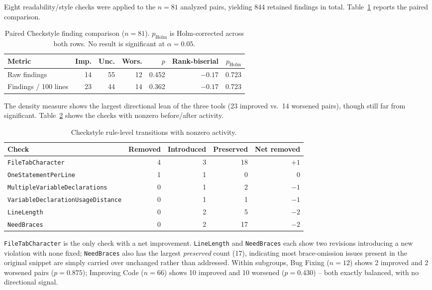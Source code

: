 Eight readability/style checks were applied to the $n=81$ analyzed
pairs, yielding 844 retained findings in total.
Table~\ref{tab:ba-checkstyle} reports the paired comparison.

\begin{table}[htbp]
\centering
\caption{Paired Checkstyle finding comparison ($n=81$). $p_{\text{Holm}}$
is Holm-corrected across both rows. No result is significant at
$\alpha=0.05$.}
\label{tab:ba-checkstyle}
\small
\begin{tabular}{lrrrrrr}
\toprule
Metric & Imp. & Unc. & Wors. & $p$ & Rank-biserial & $p_{\text{Holm}}$ \\
\midrule
Raw findings         & 14 & 55 & 12 & 0.452 & $-0.17$ & 0.723 \\
Findings / 100 lines & 23 & 44 & 14 & 0.362 & $-0.17$ & 0.723 \\
\bottomrule
\end{tabular}
\end{table}

The density measure shows the largest directional lean of the three
tools (23 improved vs.\ 14 worsened pairs), though still far from
significant. Table~\ref{tab:ba-checkstyle-rules} shows the checks with
nonzero before/after activity.

\begin{table}[htbp]
\centering
\caption{Checkstyle rule-level transitions with nonzero activity.}
\label{tab:ba-checkstyle-rules}
\small
\begin{tabular}{lrrrr}
\toprule
Check & Removed & Introduced & Preserved & Net removed \\
\midrule
\texttt{FileTabCharacter}                  & 4 & 3 & 18 & $+1$ \\
\texttt{OneStatementPerLine}                & 1 & 1 & 0  & $0$ \\
\texttt{MultipleVariableDeclarations}       & 0 & 1 & 2  & $-1$ \\
\texttt{VariableDeclarationUsageDistance}   & 0 & 1 & 1  & $-1$ \\
\texttt{LineLength}                          & 0 & 2 & 5  & $-2$ \\
\texttt{NeedBraces}                          & 0 & 2 & 17 & $-2$ \\
\bottomrule
\end{tabular}
\end{table}

\texttt{FileTabCharacter} is the only check with a net improvement.
\texttt{LineLength} and \texttt{NeedBraces} each show two revisions
introducing a new violation with none fixed; \texttt{NeedBraces} also has
the largest \emph{preserved} count (17), indicating most brace-omission
issues present in the original snippet are simply carried over unchanged
rather than addressed. Within subgroups, Bug Fixing ($n=12$) shows 2
improved and 2 worsened pairs ($p=0.875$); Improving Code ($n=66$) shows
10 improved and 10 worsened ($p=0.430$) -- both exactly balanced, with no
directional signal.

